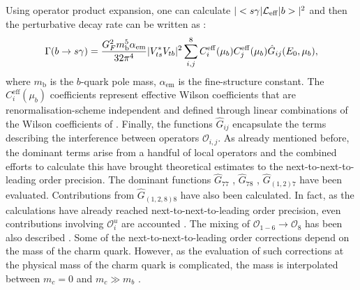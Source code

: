 Using operator product expansion, one can calculate $|<s\gamma|\mathcal{L}_{\mathrm{eff}}|b>|^2$ and then the perturbative decay rate can be written as \cite{Misiak:2020vlo}:
\begin{equation}\label{eq:theory_decay_rate}
    \Gamma(b\rightarrow s\gamma) = \frac{G^2_F m_{\mathrm{b}}^5 \alpha_{\mathrm{em}}}{32\pi^4}|V_{ts}^*V_{tb}|^2\sum_{i,j}^8C^{\mathrm{eff}}_{i}(\mu_b)C^{\mathrm{eff}}_{j}(\mu_b)\hat{G}_{ij}(E_0,\mu_b),
\end{equation}
where $m_{\mathrm{b}}$ is the $b$-quark pole mass, $\alpha_{\mathrm{em}}$ is the fine-structure constant.
The $C_{i}^{\mathrm{eff}}(\mu_b)$ coefficients represent effective Wilson coefficients \cite{Buras:1993xp} that are renormalisation-scheme independent and defined through linear combinations of the Wilson coefficients of .
Finally, the functions $\hat{G}_{ij}$ encapsulate the terms describing the interference between operators $\mathcal{O}_{i,j}$.
As already mentioned before, the dominant terms arise from a handful of local operators and the combined efforts to calculate this have brought \BtoXsgamma theoretical estimates to the next-to-next-to-leading order precision.
The dominant functions $\hat{G}_{77}$ \cite{Asatrian:2006rq}, $\hat{G}_{78}$ \cite{Asatrian:2010rq}, $\hat{G}_{(1,2)7}$ \cite{Boughezal:2007ny,Misiak:2020vlo} have been evaluated.
Contributions from $\hat{G}_{(1,2,8)8}$ \cite{Ferroglia:2010xe,Misiak:2010tk} have also been calculated.
In fact, as the calculations have already reached next-to-next-to-leading order precision, even contributions involving $\mathcal{O}_{i}^u$ are accounted \cite{Huber:2014nna}.
The mixing of $\mathcal{O}_{1-6}\to\mathcal{O}_8$ has been also described \cite{Czakon:2006ss}. 
Some of the next-to-next-to-leading order corrections depend on the mass of the charm quark.
However, as the evaluation of such corrections at the physical mass of the charm quark is complicated, the mass is interpolated between $m_c=0$ and $m_c\gg m_b$ \cite{Misiak:2019ccp}.


